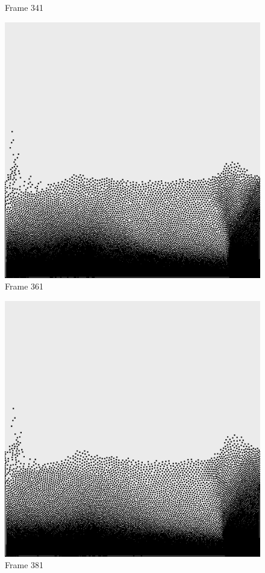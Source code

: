 \documentclass[a4paper, 12pt, oneside]{book}
\begin{document}
\begin{figure}[!ht]
\begin{center}
            Frame 341
        \end{center}
    \endminipage
    \hfill
        \begin{center}
            \includegraphics[width=\linewidth]{images/test_case_2/361.png}
            Frame 361
        \end{center}
    \endminipage
    \hfill
        \begin{center}
            \includegraphics[width=\linewidth]{images/test_case_2/381.png}
            Frame 381
        \end{center}
    \endminipage
    \hfill
\end{figure}
\end{document}

